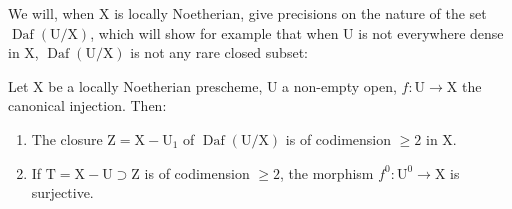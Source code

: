 We will, when $\mathrm{X}$ is locally Noetherian, give precisions on the nature of the set $\operatorname{Daf}(\mathrm{U}/\mathrm{X})$, which will show for example that when $\mathrm{U}$ is not everywhere dense in $\mathrm{X}$, $\operatorname{Daf}(\mathrm{U}/\mathrm{X})$ is not any rare closed subset:

\begin{theorem}[21.12.6]
\label{IV.21.12.6}
Let $\mathrm{X}$ be a locally Noetherian prescheme, $\mathrm{U}$ a non-empty open, $f:\mathrm{U}\to\mathrm{X}$ the canonical injection.
Then:
\begin{enumerate}[label=(\roman*)]
  \item The closure $\mathrm{Z}=\mathrm{X}-\mathrm{U}_1$ of $\operatorname{Daf}(\mathrm{U}/\mathrm{X})$ is of codimension $\geq 2$ in $\mathrm{X}$.
  \item If $\mathrm{T}=\mathrm{X}-\mathrm{U}\supset\mathrm{Z}$ is of codimension $\geq 2$, the morphism $f^0:\mathrm{U}^0\to\mathrm{X}$ is surjective.
\end{enumerate}
\end{theorem}

